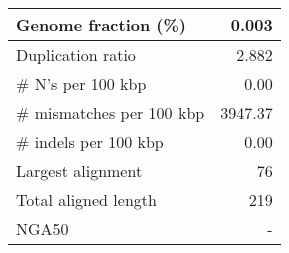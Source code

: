\documentclass[12pt,a4paper]{article}
\begin{document}
\begin{table}[ht]
\begin{center}
\begin{tabular}{|l*{1}{|r}|}
Genome fraction (\%) & 0.003 \\ \hline
Duplication ratio & 2.882 \\ \hline
\# N's per 100 kbp & 0.00 \\ \hline
\# mismatches per 100 kbp & 3947.37 \\ \hline
\# indels per 100 kbp & 0.00 \\ \hline
Largest alignment & 76 \\ \hline
Total aligned length & 219 \\ \hline
NGA50 & - \\ \hline
\end{tabular}
\end{center}
\end{table}
\end{document}
